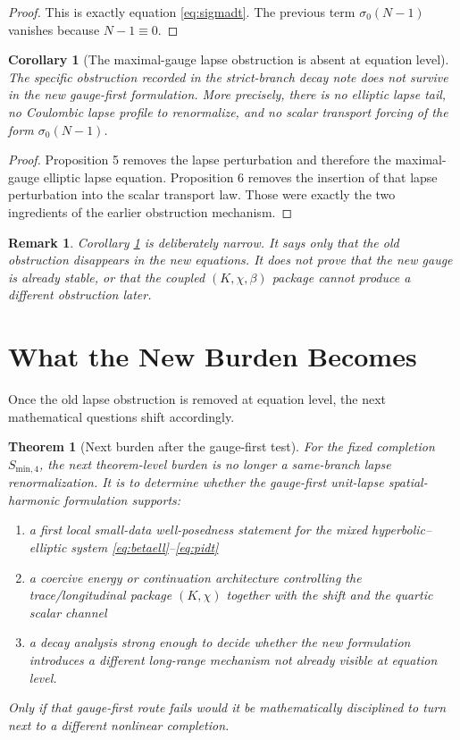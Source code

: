\documentclass[11pt]{article}
\newtheorem{remark}{Remark}
\newtheorem{corollary}{Corollary}
\newtheorem{theorem}{Theorem}
\begin{document}
\begin{proof}
This is exactly equation \eqref{eq:sigmadt}. The previous term \(\sigma_0(N-1)\) vanishes because \(N-1\equiv 0\).
\end{proof}

\begin{corollary}[The maximal-gauge lapse obstruction is absent at equation level]
The specific obstruction recorded in the strict-branch decay note does not survive in the new gauge-first formulation. More precisely, there is no elliptic lapse tail, no Coulombic lapse profile to renormalize, and no scalar transport forcing of the form \(\sigma_0(N-1)\).
\label{cor:obstructiongone}
\end{corollary}

\begin{proof}
Proposition 5 removes the lapse perturbation and therefore the maximal-gauge elliptic lapse equation. Proposition 6 removes the insertion of that lapse perturbation into the scalar transport law. Those were exactly the two ingredients of the earlier obstruction mechanism.
\end{proof}

\begin{remark}
Corollary \ref{cor:obstructiongone} is deliberately narrow. It says only that the \emph{old} obstruction disappears in the new equations. It does not prove that the new gauge is already stable, or that the coupled \((K,\chi,\beta)\) package cannot produce a different obstruction later.
\end{remark}

\section{What the New Burden Becomes}

Once the old lapse obstruction is removed at equation level, the next mathematical questions shift accordingly.

\begin{theorem}[Next burden after the gauge-first test]
For the fixed completion \(S_{\mathrm{min},4}\), the next theorem-level burden is no longer a same-branch lapse renormalization. It is to determine whether the gauge-first unit-lapse spatial-harmonic formulation supports:
\begin{enumerate}
    \item a first local small-data well-posedness statement for the mixed hyperbolic--elliptic system \eqref{eq:betaell}--\eqref{eq:pidt}
    \item a coercive energy or continuation architecture controlling the trace/longitudinal package \((K,\chi)\) together with the shift and the quartic scalar channel
    \item a decay analysis strong enough to decide whether the new formulation introduces a different long-range mechanism not already visible at equation level.
\end{enumerate}
Only if that gauge-first route fails would it be mathematically disciplined to turn next to a different nonlinear completion.
\end{theorem}
\end{document}
